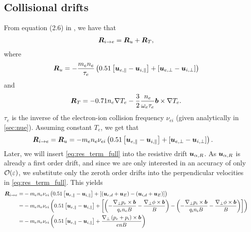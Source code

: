 \subsection{Collisional drifts}
%
From equation (2.6) in \cite{Braginskii1965}, we have that
%
\begin{align*}
    \boldsymbol{R}_{i \to e}
    =
    \boldsymbol{R}_{u} + \boldsymbol{R}_{T},
\end{align*}
%
where
%
\begin{align*}
    \boldsymbol{R}_{u}
    =
    -\frac{m_en_e}{\tau_e}\left(0.51\left[\boldsymbol{u}_{e,\|}-\boldsymbol{u}_{i,\|}\right] +
    \left[\boldsymbol{u}_{e,\perp}-\boldsymbol{u}_{i,\perp}\right]\right)
\end{align*}
%
and
%
\begin{align*}
    \boldsymbol{R}_{T}
    =
    -0.71n_e\nabla T_e -
    \frac{3}{2}\frac{n_e}{\omega_e\tau_e}\boldsymbol{b}\times\nabla T_e.
\end{align*}
%
$\tau_e$ is the inverse of the electron-ion collision frequency $\nu_{ei}$ (given analytically in \cref{sec:nue}).
Assuming constant $T_e$, we get that
%
\begin{align}
    \boldsymbol{R}_{i \to e}
    = \boldsymbol{R}_{u}
   &= -m_en_e\nu_{ei}\left(0.51\left[\boldsymbol{u}_{e,\|}-\boldsymbol{u}_{i,\|}\right] +
      \left[\boldsymbol{u}_{e,\perp}-\boldsymbol{u}_{i,\perp}\right]\right).
   \label{eq:res_term_full}
\end{align}
%
Later, we will insert \cref{eq:res_term_full} into the resistive drift $\boldsymbol{u}_{\alpha,R}$.
As $\boldsymbol{u}_{\alpha,R}$ is already a first order drift, and since we are only interested in an accuracy of only $\mathcal{O}(\varepsilon)$, we substitute only the zeroth order drifts into the perpendicular velocities in \cref{eq:res_term_full}.
This yields
%
\begin{align*}
    \ve{R}_{i \to e}
    =&
    -m_en_e\nu_{ei}
   \L( 0.51 \L[\ve{u}_{e,\|}-\ve{u}_{i,\|}\R] +
      \L[
         \L(
           \ve{u}_{e,d} + \ve{u}_E
          \R)
          -
         \L(
          \ve{u}_{i,d} + \ve{u}_E
         \R)
      \R]
   \R)
   \\
%
%
   =&
   -m_en_e\nu_{ei}
   \L( 0.51 \L[\ve{u}_{e,\|}-\ve{u}_{i,\|}\R] +
      \L[
         \L(
            -
            \frac{\grad_\perp p_e \times \ve{b}}{q_en_eB}
            -
            \frac{\grad_\perp \phi \times \ve{b}}{B}
          \R)
          -
         \L(
            -
            \frac{\grad_\perp p_i \times \ve{b}}{q_in_iB}
            -
          \frac{\grad_\perp \phi \times \ve{b}}{B}
         \R)
      \R]
   \R)
   \\
%
%
   =&
   -m_en_e\nu_{ei}
   \L(0.51\L[\ve{u}_{e,\|}-\ve{u}_{i,\|}\R] + \frac{\grad_\perp \L(p_e + p_i\R) \times \ve{b}}{enB}
  \R)
\end{align*}
